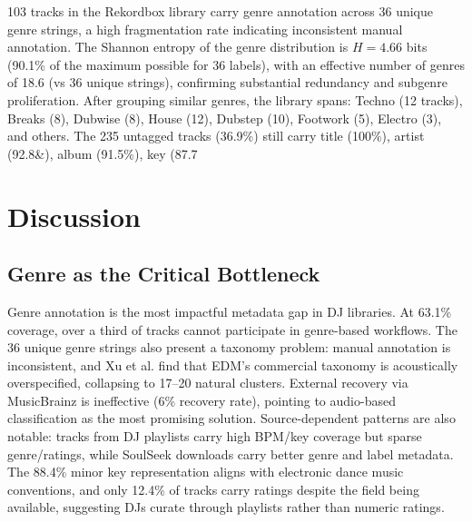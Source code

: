 \documentclass[letterpaper,10pt]{article}
\let\citep\cite  %
\begin{document}
103 tracks in the Rekordbox library carry genre annotation across 36 unique genre strings, a high fragmentation rate indicating inconsistent manual annotation. The Shannon entropy of the genre distribution is $H=4.66$ bits (90.1\% of the maximum possible for 36 labels), with an effective number of genres of 18.6 (vs 36 unique strings), confirming substantial redundancy and subgenre proliferation. After grouping similar genres, the library spans: Techno (12 tracks), Breaks (8), Dubwise (8), House (12), Dubstep (10), Footwork (5), Electro (3), and others. The 235 untagged tracks (36.9\%) still carry title (100\%), artist (92.8\&), album (91.5\%), key (87.7%

\section{Discussion}

\subsection{Genre as the Critical Bottleneck}

Genre annotation is the most impactful metadata gap in DJ libraries. At 63.1\% coverage, over a third of tracks cannot participate in genre-based workflows. The 36 unique genre strings also present a taxonomy problem: manual annotation is inconsistent, and Xu et al. \citep{xu2025edmtaxonomy} find that EDM's commercial taxonomy is acoustically overspecified, collapsing to 17--20 natural clusters. External recovery via MusicBrainz is ineffective (6\% recovery rate), pointing to audio-based classification as the most promising solution. Source-dependent patterns are also notable: tracks from DJ playlists carry high BPM/key coverage but sparse genre/ratings, while SoulSeek downloads carry better genre and label metadata. The 88.4\% minor key representation aligns with electronic dance music conventions, and only 12.4\% of tracks carry ratings despite the field being available, suggesting DJs curate through playlists rather than numeric ratings.
\end{document}
